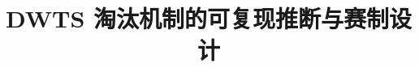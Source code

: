\documentclass[12pt]{article}  %
\title{DWTS 淘汰机制的可复现推断与赛制设计}  %
\begin{document}
	
	

	
	\tableofcontents  %
	
	
	
	
	
	
	
	
	
	
	\clearpage
	\label{MyLastPage}

\end{document}
